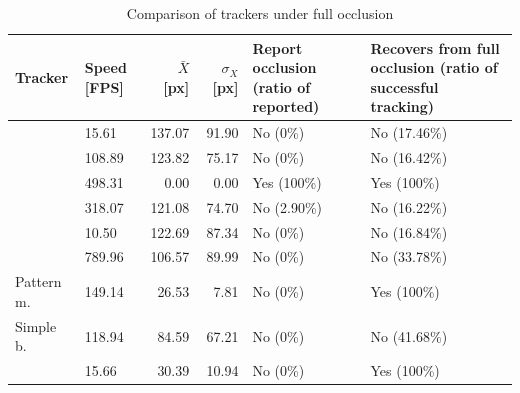\begin{table}
\centering
\begin{tabular}{l|p{1.2cm}|r|r|p{2.5cm}|p{3.5cm}}
Tracker & Speed [FPS] & $\bar{X}$ [px] & $\sigma_X$ [px]&  Report occlusion (ratio of reported) & Recovers from full occlusion (ratio of successful tracking) \\
\hline
\boost{} & 15.61 & 137.07 & 91.90 & No (0\%) & No (17.46\%) \\
\corr{} & 108.89 & 123.82 & 75.17 & No (0\%) & No (16.42\%) \\
\hsv{} & 498.31 & 0.00 & 0.00 & Yes (100\%) & Yes (100\%) \\
\medflow{} & 318.07 & 121.08 & 74.70 & No (2.90\%) & No (16.22\%) \\
\mil{} & 10.50 & 122.69 & 87.34 & No (0\%) & No (16.84\%) \\
\mosse{} & 789.96 & 106.57 & 89.99 & No (0\%) & No (33.78\%) \\
Pattern m. & 149.14 & 26.53 & 7.81 & No (0\%) & Yes (100\%) \\
Simple b. & 118.94 & 84.59 & 67.21 & No (0\%) & No (41.68\%) \\
\tld{} & 15.66 & 30.39 & 10.94 & No (0\%) & Yes (100\%) \\
\end{tabular}
\caption{Comparison of trackers under full occlusion}
\label{table:full-occlusion}
\end{table}

